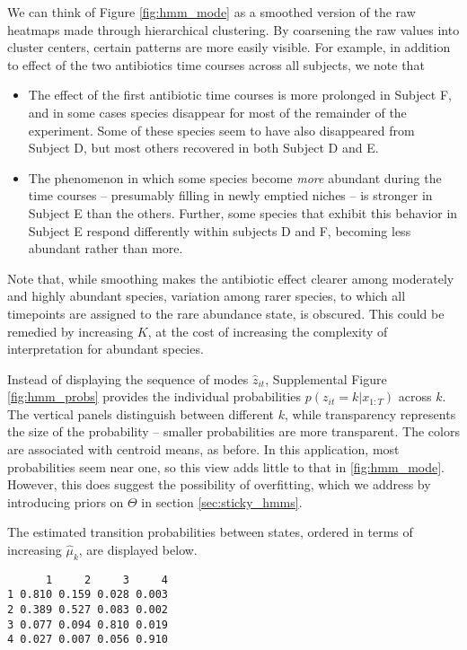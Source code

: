 \documentclass[14pt]{extreport}
\begin{document}
We can think of Figure \ref{fig:hmm_mode} as a smoothed version of the raw
heatmaps made through hierarchical clustering. By coarsening the raw values into
cluster centers, certain patterns are more easily visible. For example, in
addition to effect of the two antibiotics time courses across all subjects, we
note that

\begin{itemize}
\item The effect of the first antibiotic time courses is more prolonged in
  Subject F, and in some cases species disappear for most of the remainder of
  the experiment. Some of these species seem to have also disappeared from
  Subject D, but most others recovered in both Subject D and E.
\item The phenomenon in which some species become \textit{more} abundant during
  the time courses -- presumably filling in newly emptied niches -- is stronger
  in Subject E than the others. Further, some species that exhibit this behavior
  in Subject E respond differently within subjects D and F, becoming less
  abundant rather than more.
\end{itemize}

Note that, while smoothing makes the antibiotic effect clearer among moderately
and highly abundant species, variation among rarer species, to which all
timepoints are assigned to the rare abundance state, is obscured. This could be
remedied by increasing $K$, at the cost of increasing the complexity of
interpretation for abundant species.

Instead of displaying the sequence of modes $\hat{z}_{it}$, Supplemental Figure
\ref{fig:hmm_probs} provides the individual probabilities $p\left(z_{it} = k
\vert x_{1:T}\right)$ across $k$. The vertical panels distinguish between
different $k$, while transparency represents the size of the probability --
smaller probabilities are more transparent. The colors are associated with
centroid means, as before. In this application, most probabilities seem near
one, so this view adds little to that in \ref{fig:hmm_mode}. However, this does
suggest the possibility of overfitting, which we address by introducing priors
on $\Theta$ in section \ref{sec:sticky_hmms}.

The estimated transition probabilities between states, ordered in terms of
increasing $\hat{\mu}_{k}$, are displayed below.
\begin{verbatim}
      1     2     3     4
1 0.810 0.159 0.028 0.003
2 0.389 0.527 0.083 0.002
3 0.077 0.094 0.810 0.019
4 0.027 0.007 0.056 0.910
\end{verbatim}
\end{document}
